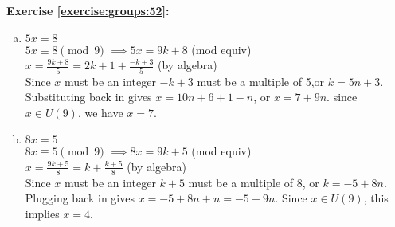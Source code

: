 \noindent\textbf{Exercise \ref{exercise:groups:52}:}
\begin{enumerate}[(a)]
\item
$5x=8$\\
$5x \equiv 8 \pmod{9}$
$\implies 5x = 9k + 8$ \quad \quad (mod equiv)\\
$x = \frac{9k + 8}{5} = 2k + 1 + \frac{-k+3}{5}$ \quad \quad (by algebra)\\
Since $x$ must be an integer $-k+3$ must be a multiple of 5,or $k = 5n + 3$. Substituting back in gives $x = 10n+6+1-n$, or $x = 7+9n$.  since $x \in U(9)$, we have $x=7$.



\item
$8x=5$\\
$8x \equiv 5 \pmod{9}$
$\implies 8x = 9k + 5$ \quad \quad (mod equiv)\\
$x = \frac{9k + 5}{8} = k + \frac{k+5}{8}$ \quad \quad (by algebra)\\
Since $x$ must be an integer $k + 5$ must be a multiple of 8, or $k = -5 + 8n$.\\
Plugging back in gives $x = -5 + 8n +n=-5 + 9n$. Since $x \in U(9)$, this implies $x=4$.
\end{enumerate}

